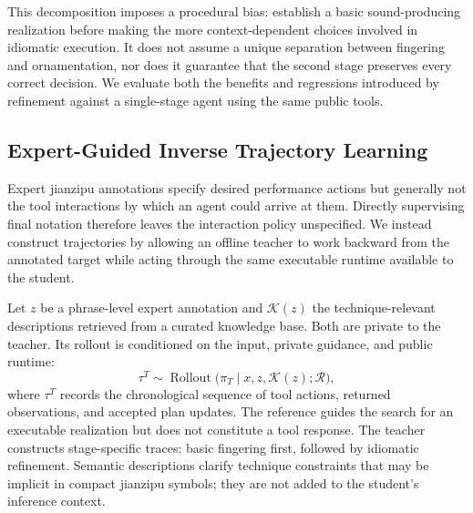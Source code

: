 \documentclass[11pt]{article}
\begin{document}
This decomposition imposes a procedural bias: establish a basic sound-producing realization before making the more context-dependent choices involved in idiomatic execution. It does not assume a unique separation between fingering and ornamentation, nor does it guarantee that the second stage preserves every correct decision. We evaluate both the benefits and regressions introduced by refinement against a single-stage agent using the same public tools.

\subsection{Expert-Guided Inverse Trajectory Learning}\label{sec:inverse}
Expert jianzipu annotations specify desired performance actions but generally not the tool interactions by which an agent could arrive at them. Directly supervising final notation therefore leaves the interaction policy unspecified. We instead construct trajectories by allowing an offline teacher to work backward from the annotated target while acting through the same executable runtime available to the student.

Let $z$ be a phrase-level expert annotation and $\mathcal{K}(z)$ the technique-relevant descriptions retrieved from a curated knowledge base. Both are private to the teacher. Its rollout is conditioned on the input, private guidance, and public runtime:
\begin{equation}
    \tau^T\sim\operatorname{Rollout}
      \bigl(\pi_T\mid x,z,\mathcal{K}(z);\mathcal{R}\bigr),
    \label{eq:teacher}
\end{equation}
where $\tau^T$ records the chronological sequence of tool actions, returned observations, and accepted plan updates. The reference guides the search for an executable realization but does not constitute a tool response. The teacher constructs stage-specific traces: basic fingering first, followed by idiomatic refinement. Semantic descriptions clarify technique constraints that may be implicit in compact jianzipu symbols; they are not added to the student's inference context.
\end{document}
